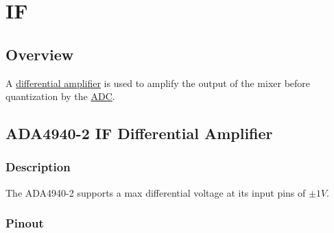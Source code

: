 \section{IF}
\label{sec:if}

\subsection{Overview}
\label{sec:if-overview}

A \hyperref[sec:ada4940-2]{differential amplifier} is used to amplify the output of the mixer before
quantization by the \hyperref[sec:ltc2292]{ADC}.

\subsection{ADA4940-2 IF Differential Amplifier}
\label{sec:ada4940-2}

\subsubsection{Description}
\label{sec:ada4940-2-description}

The ADA4940-2 supports a max differential voltage at its input pins of $\pm 1 \si{V}$. 

\subsubsection{Pinout}
\label{sec:ada4940-2-pinout}

